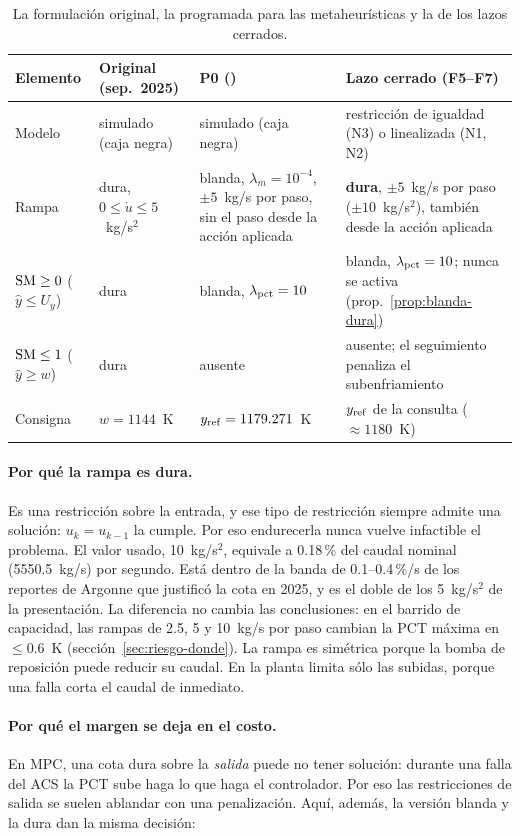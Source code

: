 \begin{table}[H]\centering\small
\begin{tabularx}{\linewidth}{@{}l Y Y Y@{}}\toprule
Elemento & Original (sep.~2025) & P0 () & Lazo cerrado (F5--F7)\\\midrule
Modelo & simulado (caja negra) & simulado (caja negra) & restricción de igualdad (N3) o linealizada (N1, N2)\\
Rampa & dura, $0\le\dot u\le5$~kg/s$^2$ & blanda, $\lambda_m=10^{-4}$, $\pm5$~kg/s por paso, sin el paso desde la acción aplicada & \textbf{dura}, $\pm5$~kg/s por paso ($\pm10$~kg/s$^2$), también desde la acción aplicada\\
${\rm SM}\ge0$ ($\hat y\le U_y$) & dura & blanda, $\lambda_{\rm pct}=10$ & blanda, $\lambda_{\rm pct}=10$; nunca se activa (prop.~\ref{prop:blanda-dura})\\
${\rm SM}\le1$ ($\hat y\ge w$) & dura & ausente & ausente; el seguimiento penaliza el subenfriamiento\\
Consigna & $w=1144$~K & $y_{\rm ref}=1179.271$~K & $y_{\rm ref}$ de la consulta ($\approx1180$~K)\\\bottomrule
\end{tabularx}
\caption{La formulación original, la programada para las metaheurísticas y la de los lazos
cerrados.}
\label{tab:formulaciones-historia}
\end{table}

\paragraph{Por qué la rampa es dura.} Es una restricción sobre la entrada, y ese tipo de
restricción siempre admite una solución: $u_k=u_{k-1}$ la cumple. Por eso endurecerla nunca
vuelve infactible el problema. El valor usado, 10~kg/s$^2$, equivale a 0.18\,\% del caudal
nominal (5550.5~kg/s) por segundo. Está dentro de la banda de 0.1--0.4\,\%/s de los reportes
de Argonne que justificó la cota en 2025, y es el doble de los 5~kg/s$^2$ de la presentación.
La diferencia no cambia las conclusiones: en el barrido de capacidad, las rampas de 2.5, 5 y
10~kg/s por paso cambian la PCT máxima en $\le0.6$~K (sección~\ref{sec:riesgo-donde}). La
rampa es simétrica porque la bomba de reposición puede reducir su caudal. En la planta limita
sólo las subidas, porque una falla corta el caudal de inmediato.

\paragraph{Por qué el margen se deja en el costo.} En MPC, una cota dura sobre la
\emph{salida} puede no tener solución: durante una falla del ACS la PCT sube haga lo que haga
el controlador. Por eso las restricciones de salida se suelen ablandar con una penalización.
Aquí, además, la versión blanda y la dura dan la misma decisión:

